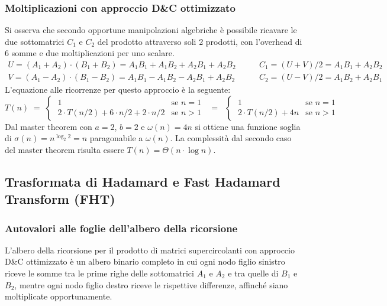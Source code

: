 \subsubsection*{Moltiplicazioni con approccio D\&C ottimizzato}
Si osserva che secondo opportune manipolazioni algebriche è possibile ricavare le due sottomatrici \(C_1\) e \(C_2\)
del prodotto attraverso soli 2 prodotti, con l'overhead di 6 somme e due moltiplicazioni per uno scalare.
\[\begin{array}{l}
	U = (A_1 + A_2) \cdot (B_1 + B_2) = A_1 B_1 + A_1 B_2 + A_2 B_1 + A_2 B_2 \\[3pt]
	V = (A_1 - A_2) \cdot (B_1 - B_2) = A_1 B_1 - A_1 B_2 - A_2 B_1 + A_2 B_2
\end{array} \qquad \begin{array}{l}
	C_1 = (U + V)/2 = A_1 B_1 + A_2 B_2 \\[3pt]
	C_2 = (U - V)/2 = A_1 B_2 + A_2 B_1
\end{array}\]
L'equazione alle ricorrenze per questo approccio è la seguente:
\[T(n) \; = \; \begin{cases}
	\; 1 & \text{se } n = 1 \\[3pt]
	\; 2 \cdot T(n/2) + 6 \cdot n/2 + 2 \cdot n/2 & \text{se } n > 1
\end{cases} \;\; = \;\; \begin{cases}
	\; 1 & \text{se } n = 1 \\[3pt]
	\; 2 \cdot T(n/2) + 4n & \text{se } n > 1
\end{cases}\]
Dal master theorem con \(a = 2\), \(b = 2\) e \(\omega(n) = 4n\) si ottiene una funzione soglia di
\(\sigma(n) = n^{\log_2 2} = n\) paragonabile a \(\omega(n)\). La complessità dal secondo caso del
master theorem risulta essere \(T(n) = \Theta(n \cdot \log n)\).

\subsection{Trasformata di Hadamard e Fast Hadamard Transform (FHT)}
\subsubsection*{Autovalori alle foglie dell'albero della ricorsione}
L'albero della ricorsione per il prodotto di matrici supercircolanti con approccio D\&C ottimizzato è un albero binario
completo in cui ogni nodo figlio sinistro riceve le somme tra le prime righe delle sottomatrici \(A_1\) e \(A_2\) e tra
quelle di \(B_1\) e \(B_2\), mentre ogni nodo figlio destro riceve le rispettive differenze, affinché siano moltiplicate opportunamente.

